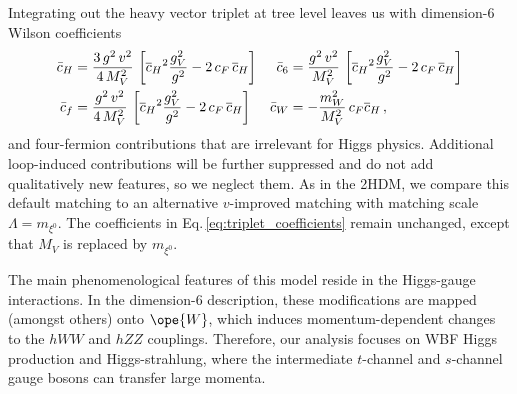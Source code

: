 Integrating out the heavy vector triplet at tree level leaves us with
dimension-6 Wilson coefficients
%
\begin{align} \bar{c}_{H} &=
\dfrac{3\,g^2\,v^2}{4\,M_V^2}\,\left[{\overline{c}_{H}}^2\dfrac{g_V^2}{g^2}
- 2\,{c_F}\,{\overline{c}_{H}}\right] &\bar{c}_{6} &=
\dfrac{g^2\,v^2}{M_V^2}\,\left[{\overline{c}_{H}}^2\dfrac{g_V^2}{g^2}
- 2\,{c_F}\,{\overline{c}_{H}} \right] \notag \\ \bar{c}_{f} &=
\dfrac{g^2\,v^2}{4\,M_V^2}\,\left[{\overline{c}_{H}}^2\dfrac{g_V^2}{g^2}
- 2\,{c_F}\,{\overline{c}_{H}} \right] &\bar{c}_{W} &= -
\dfrac{m_W^2}{M_V^2}\, {c_F}{\overline{c}_{H}} \,,
 \label{eq:triplet_coefficients}
\end{align}
%
and four-fermion contributions that are irrelevant for Higgs physics.
Additional loop-induced contributions will be further suppressed and
do not add qualitatively new features, so we neglect them.  As in the
2HDM, we compare this default matching to an alternative $v$-improved
matching with matching scale $\Lambda = m_{\xi^0}$. The coefficients
in Eq.\,\eqref{eq:triplet_coefficients} remain unchanged, except that
$M_V$ is replaced by $m_{\xi^0}$.

The main phenomenological features of this model reside in the
Higgs-gauge interactions. In the dimension-6 description, these
modifications are mapped (amongst others) onto $\ope{W}$, which
induces momentum-dependent changes to the $hWW$ and $hZZ$
couplings. Therefore, our analysis focuses on WBF Higgs production and
Higgs-strahlung, where the intermediate $t$-channel and $s$-channel
gauge bosons can transfer large momenta.\medskip

